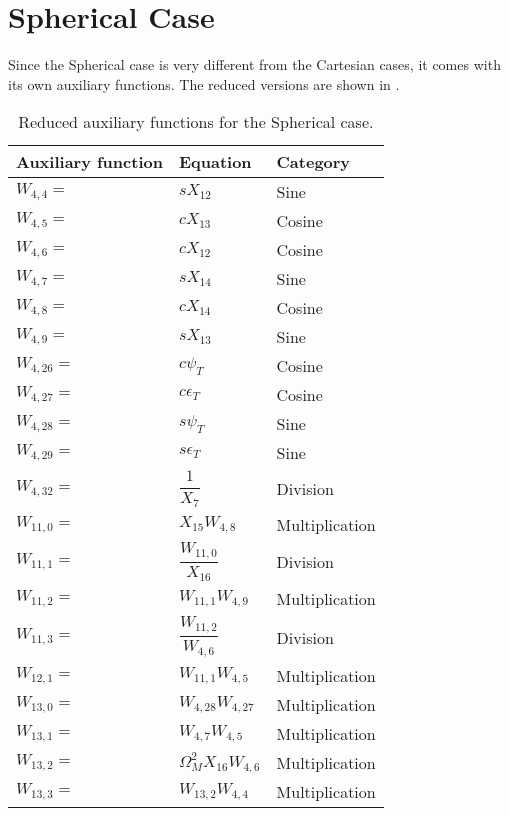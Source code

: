 \section{Spherical Case}
\label{sec:spherApp}
Since the Spherical case is very different from the Cartesian cases, it comes with its own auxiliary functions. The reduced versions are shown in .

\begin{longtable}{|p{1.5cm}|l|p{2cm}|}
\caption{Reduced auxiliary functions for the Spherical case.}
\label{tab:auxFunc3}
\endfirsthead
\endhead
\hline
\textbf{Auxiliary function} & \textbf{Equation} & \textbf{Category}  \\ \hline \hline
\hline 
$W_{4,4}=$ & $ s X_{12} $ & Sine \\ \hline 
$W_{4,5}=$ & $ c X_{13} $ & Cosine \\ \hline 
$W_{4,6}=$ & $ c X_{12} $ & Cosine \\ \hline 
$W_{4,7}=$ & $ s X_{14} $ & Sine \\ \hline 
$W_{4,8}=$ & $ c X_{14} $ & Cosine \\ \hline 
$W_{4,9}=$ & $ s X_{13} $ & Sine \\ \hline 
$W_{4,26}=$ & $ c \psi_{T} $ & Cosine \\ \hline 
$W_{4,27}=$ & $ c \epsilon_{T} $ & Cosine \\ \hline 
$W_{4,28}=$ & $ s \psi_{T} $ & Sine \\ \hline 
$W_{4,29}=$ & $ s \epsilon_{T} $ & Sine \\ \hline 
$W_{4,32}=$ & $ \dfrac{1}{X_{7}} $ & Division \\ \hline 
$W_{11,0}=$ & $ X_{15}W_{4,8} $ & Multiplication \\ \hline
$W_{11,1}=$ & $ \dfrac{W_{11,0}}{X_{16}} $ & Division \\ \hline
$W_{11,2}=$ & $ W_{11,1}W_{4,9} $ & Multiplication \\ \hline
$W_{11,3}=$ & $ \dfrac{W_{11,2}}{W_{4,6}} $ & Division \\ \hline
$W_{12,1}=$ & $ W_{11,1}W_{4,5} $ & Multiplication \\ \hline
$W_{13,0}=$ & $ W_{4,28}W_{4,27} $ & Multiplication \\ \hline
$W_{13,1}=$ & $ W_{4,7}W_{4,5} $ & Multiplication \\ \hline
$W_{13,2}=$ & $ \Omega_{M}^{2} X_{16} W_{4,6} $ & Multiplication \\ \hline
$W_{13,3}=$ & $ W_{13,2}W_{4,4} $ & Multiplication \\ \hline

\end{longtable}
